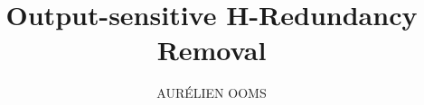 \title[]{\textbf{Output-sensitive H-Redundancy Removal\vspace{3mm}}}
\author[]{\large AURÉLIEN OOMS\vspace{5mm}}
\date{}

\begin{frame}
\titlepage{}
\end{frame}
